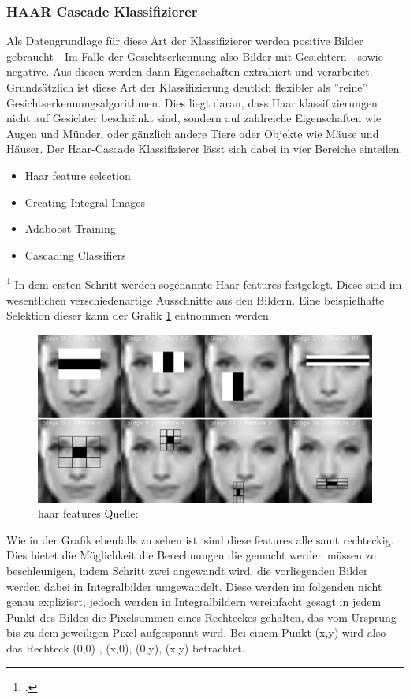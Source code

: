 \documentclass[12pt, a4paper]{scrbook}
\begin{document}
\subsubsection{HAAR Cascade Klassifizierer}
Als Datengrundlage für diese Art der Klassifizierer werden positive Bilder gebraucht - Im Falle der Gesichtserkennung also Bilder mit Gesichtern - sowie negative. Aus diesen werden dann Eigenschaften extrahiert und verarbeitet. Grundsätzlich ist diese Art der Klassifizierung deutlich flexibler als ''reine'' Gesichtserkennungsalgorithmen. Dies liegt daran, dass Haar klassifizierungen nicht auf Gesichter beschränkt sind, sondern auf zahlreiche Eigenschaften wie Augen und Münder, oder gänzlich andere Tiere oder Objekte wie Mäuse und Häuser.
Der Haar-Cascade Klassifizierer lässt sich dabei in vier Bereiche einteilen.
\begin{itemize}
\item Haar feature selection
\item Creating  Integral Images
\item Adaboost Training
\item Cascading Classifiers
\end{itemize}
\footcite[Vgl.][]{willberger}
In dem ersten Schritt werden sogenannte Haar features festgelegt. Diese sind im wesentlichen verschiedenartige Ausschnitte aus den Bildern. Eine beispielhafte Selektion dieser kann der   Grafik \ref{fig: haar-features} entnommen werden.
\begin{figure}[h]
\includegraphics[width=\linewidth]{Bilder/haar-cascade.png}
\caption{haar features \newline Quelle: %
}
\label{fig: haar-features}
\end{figure}
Wie in der Grafik ebenfalls zu sehen ist, sind diese features alle samt rechteckig. Dies bietet die Möglichkeit die Berechnungen die gemacht werden müssen zu beschleunigen, indem Schritt zwei angewandt wird. die vorliegenden Bilder werden dabei in Integralbilder umgewandelt.  Diese werden im folgenden nicht genau expliziert, jedoch werden in Integralbildern vereinfacht gesagt in jedem Punkt des Bildes die Pixelsummen eines Rechteckes gehalten, das vom Ursprung bis zu dem jeweiligen Pixel aufgespannt wird. Bei einem Punkt (x,y) wird also das Rechteck (0,0) , (x,0), (0,y), (x,y) betrachtet.
\end{document}
